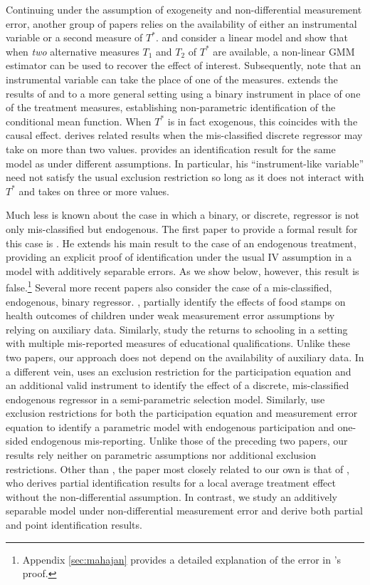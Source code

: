 Continuing under the assumption of exogeneity and non-differential measurement error, another group of papers relies on the availability of either an instrumental variable or a second measure of $T^*$.
\cite{BBS} and \cite{KRS} consider a linear model and show that when \emph{two} alternative measures $T_1$ and $T_2$ of $T^*$ are available, a non-linear GMM estimator can be used to recover the effect of interest.
Subsequently, \cite{FL} note that an instrumental variable can take the place of one of the measures.
\cite{Mahajan} extends the results of \cite{BBS} and \cite{KRS} to a more general setting using a binary instrument in place of one of the treatment measures, establishing non-parametric identification of the conditional mean function.
When $T^*$ is in fact exogenous, this coincides with the causal effect.
\cite{hu2008} derives related results when the mis-classified discrete regressor may take on more than two values.
\cite{Lewbel} provides an identification result for the same model as \cite{Mahajan} under different assumptions.
In particular, his ``instrument-like variable'' need not satisfy the usual  exclusion restriction so long as it does not interact with $T^*$ and takes on three or more values.

Much less is known about the case in which a binary, or discrete, regressor is not only mis-classified but endogenous.
The first paper to provide a formal result for this case is \cite{Mahajan}.
He extends his main result to the case of an endogenous treatment, providing an explicit proof of identification under the usual IV assumption in a model with additively separable errors.
As we show below, however, this result is false.\footnote{Appendix \ref{sec:mahajan} provides a detailed explanation of the error in \citeauthor{Mahajan}'s proof.}
Several more recent papers also consider the case of a mis-classified, endogenous, binary regressor.
\cite{kreider2012}, partially identify the effects of food stamps on health outcomes of children under weak measurement error assumptions by relying on auxiliary data.
Similarly, \cite{Batt} study the returns to schooling in a setting with multiple mis-reported measures of educational qualifications.
Unlike these two papers, our approach does not depend on the availability of auxiliary data.
In a different vein, \cite{shiu2015} uses an exclusion restriction for the participation equation and an additional valid instrument to identify the effect of a discrete, mis-classified endogenous regressor in a semi-parametric selection model.
Similarly, \cite{nguimkeu2016estimation} use exclusion restrictions for both the participation equation and measurement error equation to identify a parametric model with endogenous participation and one-sided endogenous mis-reporting. 
Unlike those of the preceding two papers, our results rely neither on parametric assumptions nor additional exclusion restrictions.
Other than \cite{Mahajan}, the paper most closely related to our own is that of \cite{Ura}, who derives partial identification results for a local average treatment effect without the non-differential assumption.
In contrast, we study an additively separable model under non-differential measurement error and derive both partial and point identification results.

